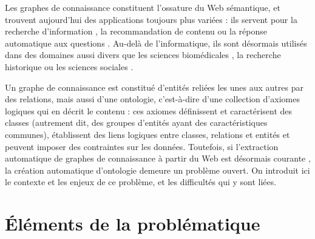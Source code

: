 \label{sec:Introduction}  %

Les graphes de connaissance constituent l'ossature du Web sémantique, et trouvent aujourd'hui des applications toujours plus variées : ils servent pour la recherche d'information \cite{bounhas2019building, dietz2018utilizing}, la recommandation de contenu \cite{ying2018graph, wang2018ripplenet, wang2019explainable} ou la réponse automatique aux questions \cite{zhang2018variational, lukovnikov2017neural, saha2018complex}.  %
Au-delà de l'informatique, ils sont désormais utilisés dans des domaines aussi divers que les sciences biomédicales \cite{bakal2018exploiting, sousa2020evolving}, la recherche historique \cite{hyvonen2019knowledge, wilcke2017user} ou les sciences sociales \cite{heling2019building}.

%
Un graphe de connaissance est constitué d'entités reliées les unes aux autres par des relations, mais aussi d'une ontologie, c'est-à-dire d'une collection d'axiomes logiques qui en décrit le contenu : ces axiomes définissent et caractérisent des classes (autrement dit, des groupes d'entités ayant des caractéristiques communes),  établissent des liens logiques entre classes, relations et entités et peuvent imposer des contraintes sur les données. Toutefois, si l'extraction automatique de graphes de connaissance à partir du Web est désormais courante \cite{auer2007dbpedia}, la création automatique d'ontologie demeure un problème ouvert. On introduit ici le contexte et les enjeux de ce problème, et les difficultés qui y sont liées.


\section{Éléments de la problématique}  %


